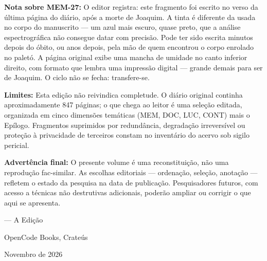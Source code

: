 \noindent\textbf{Nota sobre MEM-27:} O editor registra: este fragmento foi escrito no verso da última página do diário, após a morte de Joaquim. A tinta é diferente da usada no corpo do manuscrito — um azul mais escuro, quase preto, que a análise espectrográfica não consegue datar com precisão. Pode ter sido escrita minutos depois do óbito, ou anos depois, pela mão de quem encontrou o corpo enrolado no paletó. A página original exibe uma mancha de umidade no canto inferior direito, com formato que lembra uma impressão digital — grande demais para ser de Joaquim. O ciclo não se fecha: transfere-se.

\vspace{0.6em}

\noindent\textbf{Limites:}
Esta edição não reivindica completude. O diário original continha aproximadamente 847 páginas; o que chega ao leitor é uma seleção editada, organizada em cinco dimensões temáticas (MEM, DOC, LUC, CONT) mais o Epílogo. Fragmentos suprimidos por redundância, degradação irreversível ou proteção à privacidade de terceiros constam no inventário do acervo sob sigilo pericial.

\vspace{0.6em}

\noindent\textbf{Advertência final:}
O presente volume é uma reconstituição, não uma reprodução fac-similar. As escolhas editoriais --- ordenação, seleção, anotação --- refletem o estado da pesquisa na data de publicação. Pesquisadores futuros, com acesso a técnicas não destrutivas adicionais, poderão ampliar ou corrigir o que aqui se apresenta.

\vspace{1.2em}

\begin{flushright}
--- A Edição\par
OpenCode Books, Crateús\par
Novembro de 2026
\end{flushright}

\endgroup
\clearpage
